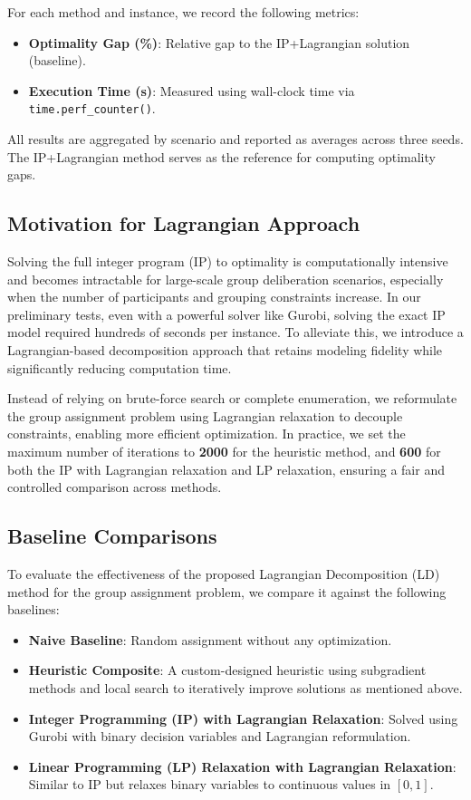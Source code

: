 For each method and instance, we record the following metrics:
\begin{itemize}
    \item \textbf{Optimality Gap (\%)}: Relative gap to the IP+Lagrangian solution (baseline).
    \item \textbf{Execution Time (s)}: Measured using wall-clock time via \texttt{time.perf\_counter()}.
\end{itemize}

All results are aggregated by scenario and reported as averages across three seeds. The IP+Lagrangian method serves as the reference for computing optimality gaps.


\subsection{Motivation for Lagrangian Approach}

Solving the full integer program (IP) to optimality is computationally intensive and becomes intractable for large-scale group deliberation scenarios, especially when the number of participants and grouping constraints increase. In our preliminary tests, even with a powerful solver like Gurobi, solving the exact IP model required hundreds of seconds per instance. To alleviate this, we introduce a Lagrangian-based decomposition approach that retains modeling fidelity while significantly reducing computation time.

Instead of relying on brute-force search or complete enumeration, we reformulate the group assignment problem using Lagrangian relaxation to decouple constraints, enabling more efficient optimization. In practice, we set the maximum number of iterations to \textbf{2000} for the heuristic method, and \textbf{600} for both the IP with Lagrangian relaxation and LP relaxation, ensuring a fair and controlled comparison across methods.

\subsection{Baseline Comparisons}

To evaluate the effectiveness of the proposed Lagrangian Decomposition (LD) method for the group assignment problem, we compare it against the following baselines:

\begin{itemize}
    \item \textbf{Naive Baseline}: Random assignment without any optimization.
    \item \textbf{Heuristic Composite}: A custom-designed heuristic using subgradient methods and local search to iteratively improve solutions as mentioned above.
    \item \textbf{Integer Programming (IP) with Lagrangian Relaxation}: Solved using Gurobi with binary decision variables and Lagrangian reformulation.
    \item \textbf{Linear Programming (LP) Relaxation with Lagrangian Relaxation}: Similar to IP but relaxes binary variables to continuous values in $[0, 1]$.
\end{itemize}

